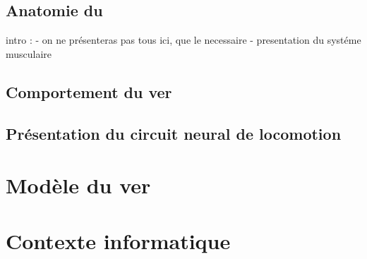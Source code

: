 \subsection{Anatomie du \celeg{}} %
\label{sub:Anatomie du caeleg}

intro :
   - on ne présenteras pas tous ici, que le necessaire
   - presentation du systéme musculaire


\subsection{Comportement du ver} %
\label{sub:Comportement du ver}


\subsection{Présentation du circuit neural de locomotion} %
\label{sub:Présentation du circuit neural de locomotion}



\section{Modèle du ver} %
\label{sec:Modèle du ver}


\section{Contexte informatique} %
\label{sec:Contexte informatique}


